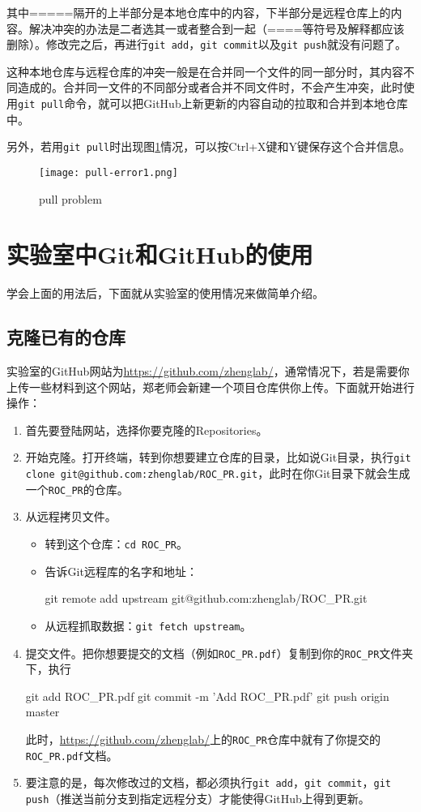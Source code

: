 \documentclass[a4paper,12pt]{article}
\begin{document}
其中=====隔开的上半部分是本地仓库中的内容，下半部分是远程仓库上的内容。解决冲突的办法是二者选其一或者整合到一起（====等符号及解释都应该删除）。修改完之后，再进行\lstinline|git add|，\lstinline|git commit|以及\lstinline|git push|就没有问题了。

这种本地仓库与远程仓库的冲突一般是在合并同一个文件的同一部分时，其内容不同造成的。合并同一文件的不同部分或者合并不同文件时，不会产生冲突，此时使用\lstinline|git pull|命令，就可以把GitHub上新更新的内容自动的拉取和合并到本地仓库中。

另外，若用\lstinline|git pull|时出现图\ref{fig:9}情况，可以按Ctrl+X键和Y键保存这个合并信息。

\begin{figure}[!htb] %
\centering
\texttt{[image: pull-error1.png]}
\caption{pull problem}\label{fig:9}
\end{figure}
\section{实验室中Git和GitHub的使用}

学会上面的用法后，下面就从实验室的使用情况来做简单介绍。

\subsection{克隆已有的仓库}

实验室的GitHub网站为\url{https://github.com/zhenglab/}，通常情况下，若是需要你上传一些材料到这个网站，郑老师会新建一个项目仓库供你上传。下面就开始进行操作：
\begin{enumerate}
\item 首先要登陆网站，选择你要克隆的Repositories。
\item 开始克隆。打开终端，转到你想要建立仓库的目录，比如说Git目录，执行\lstinline|git clone git@github.com:zhenglab/ROC_PR.git|，此时在你Git目录下就会生成一个\verb|ROC_PR|的仓库。
\item 从远程拷贝文件\cite{6:misc}。
\begin{itemize}
\item 转到这个仓库：\lstinline|cd ROC_PR|。
\item 告诉Git远程库的名字和地址：
\begin{bash}
git remote add upstream git@github.com:zhenglab/ROC_PR.git
\end{bash}
\item 从远程抓取数据：\lstinline|git fetch upstream|。
\end{itemize}
\item 提交文件。把你想要提交的文档（例如\verb|ROC_PR.pdf|）复制到你的\verb|ROC_PR|文件夹下，执行
\begin{bash}
git add ROC_PR.pdf
git commit -m 'Add ROC_PR.pdf'
git push origin master
\end{bash}
此时，\url{https://github.com/zhenglab/}上的\verb|ROC_PR|仓库中就有了你提交的\verb|ROC_PR.pdf|文档。
\item 要注意的是，每次修改过的文档，都必须执行\lstinline|git add|，\lstinline|git commit|，\lstinline|git push|（推送当前分支到指定远程分支）才能使得GitHub上得到更新。
\end{enumerate}
\end{document}
